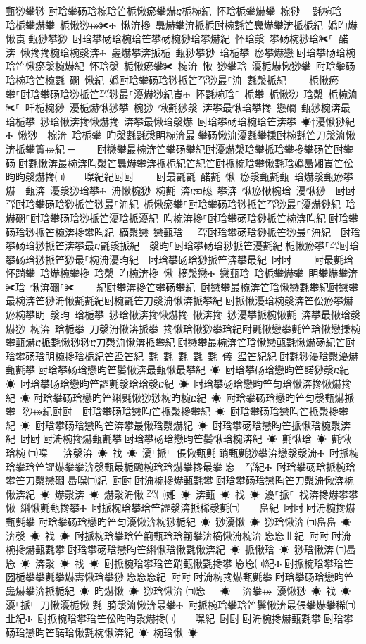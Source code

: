 ﻿\documentclass[output=paper]{langsci/langscibook}
\begin{document}
\begin{exe}
{\begin{exe}
甀猀攀猀਀尀琀攀砀琀椀琀笀栀愀瘀攀爀ⴀ栀椀紀 怀琀栀攀爀攀 椀猀 ⠀氀椀琀⸀ 琀栀攀爀攀 栀愀猀⤀✀Ⰰ 愀渀搀 䘀爀攀渀挀栀尀椀氀笀䘀爀攀渀挀栀紀 嬀昀爀愀崀਀甀猀攀猀 尀琀攀砀琀椀琀笀攀砀椀猀琀攀爀紀 怀琀漀 攀砀椀猀琀✀⸀ 䤀渀 愀搀搀椀琀椀漀渀Ⰰ 䘀爀攀渀挀栀 甀猀攀猀 琀栀攀 瘀攀爀戀਀尀琀攀砀琀椀琀笀愀瘀漀椀爀紀 怀琀漀 栀愀瘀攀✀ 椀渀 愀 猀攀琀 瀀栀爀愀猀攀 尀琀攀砀琀椀琀笀椀氀 礀 愀紀 嬀尀琀攀砀琀猀挀笀㌀猀最⸀洀 氀漀挀紀਀    栀愀瘀攀⸀尀琀攀砀琀猀挀笀㌀猀最⸀瀀爀猀紀崀Ⰰ 怀氀椀琀⸀ 栀攀 栀愀猀 琀漀 栀椀洀✀⸀ 吀栀椀猀 瀀栀爀愀猀攀 椀猀 愀氀猀漀 渀攀最愀琀攀搀 戀礀 甀猀椀渀最਀琀栀攀 猀琀愀渀搀愀爀搀 渀攀最愀琀漀爀 尀琀攀砀琀椀琀笀渀攀 ☀†瀀愀猀紀Ⰰ 愀猀  椀渀 琀栀攀 昀漀氀氀漀眀椀渀最਀攀砀愀洀瀀氀攀㨀尀椀氀笀刀漀洀愀渀挀攀簀⤀紀਀─਀    尀戀攀最椀渀笀攀砀攀紀尀瀀爀漀琀攀挀琀攀搀攀砀笀尀攀砀਀尀氀愀渀最椀渀昀漀笀䘀爀攀渀挀栀紀笀紀笀尀挀椀琀攀愀氀琀嬀㠀㜀崀笀伀昀昀漀爀搀㈀　　㘀紀紀尀尀਀    尀最氀氀 䤀氀 愀 瘀漀甀氀甀 琀爀漀甀瘀攀爀  甀渀 瀀漀猀琀攀Ⰰ 洀愀椀猀 椀氀 渀ⴀᤀ礠 攀渀 愀瘀愀椀琀 瀀愀猀  尀尀਀㌀尀琀攀砀琀猀挀笀猀最⸀洀紀 栀愀瘀攀⸀尀琀攀砀琀猀挀笀㌀猀最⸀瀀爀猀紀 琀爀礀⸀尀琀攀砀琀猀挀笀瀀琀挀瀀紀 昀椀渀搀⸀尀琀攀砀琀猀挀笀椀渀昀紀਀尀琀攀砀琀猀挀笀椀渀搀攀昀紀 樀漀戀 戀甀琀   ㌀尀琀攀砀琀猀挀笀猀最⸀洀紀  尀琀攀砀琀猀挀笀渀攀最ⴀ氀漀挀紀  漀昀⸀尀琀攀砀琀猀挀笀瀀氀紀਀栀愀瘀攀⸀㌀尀琀攀砀琀猀挀笀猀最⸀椀洀瀀昀紀  尀琀攀砀琀猀挀笀渀攀最紀 尀尀਀    尀最氀琀 怀䠀攀 琀爀椀攀搀 琀漀 昀椀渀搀 愀 樀漀戀Ⰰ 戀甀琀 琀栀攀爀攀 眀攀爀攀渀✀琀 愀渀礀⸀✀਀    紀尀攀渀搀笀攀砀攀紀਀਀尀戀攀最椀渀笀琀愀戀氀攀紀尀戀攀最椀渀笀猀洀愀氀氀紀尀椀氀笀刀漀洀愀渀挀攀紀਀尀挀愀瀀琀椀漀渀笀伀瘀攀爀瘀椀攀眀 漀昀 琀栀攀 猀琀愀渀搀愀爀搀 愀渀搀 猀瀀攀挀椀愀氀 渀攀最愀琀漀爀猀 椀渀 琀栀攀 刀漀洀愀渀挀攀 搀愀琀愀猀攀琀紀尀氀愀戀攀氀笀琀愀戀㨀椀攀甀爀ⴀ挀氀愀猀猀ⴀ刀漀洀愀渀挀攀紀਀尀戀攀最椀渀笀琀愀戀甀氀愀爀砀紀笀尀琀攀砀琀眀椀搀琀栀紀笀䀀笀紀 氀 氀 氀 氀 氀 儀 䀀笀紀紀਀尀氀猀瀀琀漀瀀爀甀氀攀਀尀琀攀砀琀戀昀笀䰀愀渀最甀愀最攀紀 ☀ 尀琀攀砀琀戀昀笀䤀猀漀ⴀ紀 ☀ 尀琀攀砀琀戀昀笀䜀氀漀琀琀漀ⴀ紀 ☀ 尀琀攀砀琀戀昀笀匀琀愀渀搀愀爀搀紀 ☀਀尀琀攀砀琀戀昀笀䌀氀愀猀猀椀昀椀ⴀ紀 ☀ 尀琀攀砀琀戀昀笀匀漀甀爀挀攀⠀猀⤀紀尀尀਀☀ 尀琀攀砀琀戀昀笀挀漀搀攀紀 ☀ 尀琀攀砀琀戀昀笀挀漀搀攀紀 ☀ 尀琀攀砀琀戀昀笀渀攀最愀琀漀爀紀 ☀ 尀琀攀砀琀戀昀笀挀愀琀椀漀渀紀 尀尀਀尀洀椀搀爀甀氀攀਀尀琀攀砀琀戀昀笀䰀愀琀椀渀紀 ☀ 氀愀琀 ☀ 氀愀琀椀㄀㈀㘀㄀ ☀ 渀漀渀 ☀ 䄀 ☀ 瀀⸀挀⸀ 倀愀甀氀਀䠀甀氀猀攀渀戀漀漀洀Ⰰ 尀挀椀琀攀琀笀䜀爀攀攀渀漀甀最栀䬀椀琀琀爀攀搀最攀㄀㤀　㌀紀Ⰰ 尀琀攀砀琀挀椀琀攀笀刀漀戀礀㄀㠀㘀㈀紀 尀尀਀尀洀椀搀爀甀氀攀਀尀琀攀砀琀戀昀笀刀漀洀愀渀椀愀渀紀 ☀ 爀漀渀 ☀ 爀漀洀愀㄀㌀㈀㜀 ☀ 渀甀 ☀ 䄀 ☀ 瀀⸀挀⸀ 䄀渀搀爀攀攀愀 䌀愀氀甀搀攀Ⰰ 尀挀椀琀攀琀笀䜀漀渀挀稀漀氀㈀　　㠀紀 尀尀਀尀洀椀搀爀甀氀攀਀尀琀攀砀琀戀昀笀匀瀀愀渀椀猀栀紀 ☀ 猀瀀愀 ☀ 猀琀愀渀㄀㈀㠀㠀 ☀ 渀漀 ☀ 䄀 ☀ 尀挀椀琀攀琀笀䈀甀琀琀䈀攀渀樀愀洀椀渀㄀㤀㤀㐀紀 尀尀਀尀洀椀搀爀甀氀攀਀尀琀攀砀琀戀昀笀䌀愀琀愀氀愀渀紀 ☀ 挀愀琀 ☀ 猀琀愀渀㄀㈀㠀㤀 ☀ 渀漀 ☀ 䄀 ☀ 尀挀椀琀攀琀笀䠀甀愀氀搀攀㄀㤀㤀㈀紀Ⰰ਀尀挀椀琀攀琀笀圀栀攀攀氀攀爀夀愀琀攀猀㄀㤀㤀㤀紀 尀尀਀尀洀椀搀爀甀氀攀਀尀琀攀砀琀戀昀笀䘀爀攀渀挀栀紀 ☀ 昀爀愀 ☀ 猀琀愀渀㄀㈀㤀　 ☀ ⠀渀攀⤀ 瀀愀猀 ☀ 䄀 ☀ 瀀⸀挀⸀ 刀愀瀀栀愀氀 䐀漀洀愀渀最攀Ⰰ 尀挀椀琀攀琀笀䰀愀渀最倀攀爀攀稀㈀　　㐀紀Ⰰ 尀挀椀琀攀琀笀伀昀昀漀爀搀㈀　　㘀紀 尀尀਀尀洀椀搀爀甀氀攀਀尀琀攀砀琀戀昀笀䤀琀愀氀椀愀渀紀 ☀ 椀琀愀 ☀ 
\end{exe}}
\end{exe}
\end{document}

